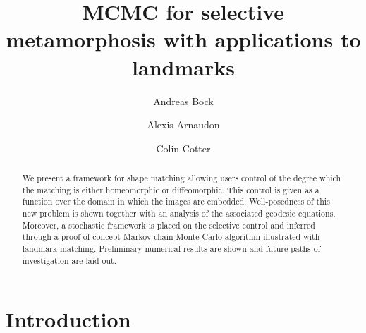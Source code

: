 \documentclass[runningheads]{llncs}
\begin{document}
%
\title{MCMC for selective metamorphosis with applications to landmarks}
%
%
\author{Andreas Bock \and  Alexis Arnaudon \and Colin Cotter}
%
%
%
\maketitle              %

\begin{abstract}
We present a framework for shape matching allowing users control of the degree
which the matching is either homeomorphic or diffeomorphic. This control is
given as a function over the domain in which the images are embedded.
Well-posedness of this new problem is shown together with an analysis of the
associated geodesic equations. Moreover, a stochastic framework is placed on the
selective control and inferred through a proof-of-concept Markov chain Monte
Carlo algorithm illustrated with landmark matching. Preliminary numerical
results are shown and future paths of investigation are laid out.
\end{abstract}

\section{Introduction}
\end{document}

